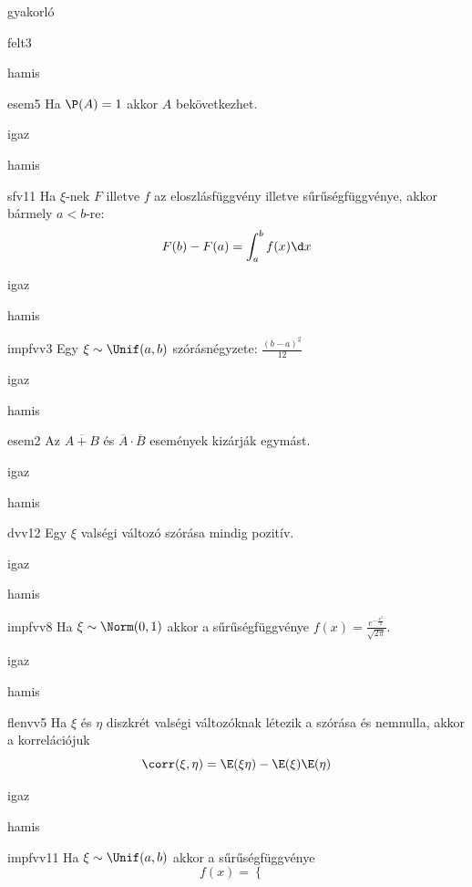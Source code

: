\documentclass[12pt]{article}
\begin{document}
\begin{quiz}{gyakorló}
\begin{multi}[feedback={Def.}]{felt3}
\item hamis
\end{multi}
\begin{multi}[feedback={Nókoment.}]{esem5}
Ha $\P(A)=1$ akkor $A$ bekövetkezhet.
\item* igaz
\item hamis
\end{multi}
\begin{multi}[feedback={Def.}]{sfv11}
Ha $\xi$-nek $F$ illetve $f$ az eloszlásfüggvény illetve sűrűségfüggvénye, akkor bármely $a<b$-re:
$$
F(b)-F(a)=\int_{a}^{b}f(x)\d x
$$
\item* igaz
\item hamis
\end{multi}
\begin{multi}[feedback={wiki}]{impfvv3}
Egy $\xi\sim \Unif(a,b)$ szórásnégyzete: $\frac{(b-a)^2}{12}$
\item* igaz
\item hamis
\end{multi}
\begin{multi}[feedback={de-Morgan azonosság}]{esem2}
Az $\overline{A+B}$ és $\overline{A} \cdot \overline{B}$ események kizárják egymást.
\item igaz
\item* hamis
\end{multi}
\begin{multi}[feedback={Egy konstans v.v-nak 0 a szórása.}]{dvv12}
Egy $\xi$ valségi változó szórása mindig pozitív.
\item igaz
\item* hamis
\end{multi}
\begin{multi}[feedback={Def.}]{impfvv8}
Ha $\xi\sim \Norm(0,1)$ akkor a sűrűségfüggvénye $f(x)=\frac{e^{-\frac{x^2}{2}}}{\sqrt{2\pi}}$.
\item* igaz
\item hamis
\end{multi}
\begin{multi}[feedback={Def.}]{flenvv5}
Ha $\xi$ és $\eta$ diszkrét valségi változóknak létezik a szórása és nemnulla, akkor a 
korrelációjuk
$$
\corr(\xi,\eta)=\E(\xi\eta)-\E(\xi)\E(\eta)
$$
\item igaz
\item* hamis
\end{multi}
\begin{multi}[feedback={Def.}]{impfvv11}
Ha $\xi\sim \Unif(a,b)$ akkor a sűrűségfüggvénye 
$$
f(x)=
\begin{cases}

\end{cases}$$
\end{multi}
\end{quiz}
\end{document}
